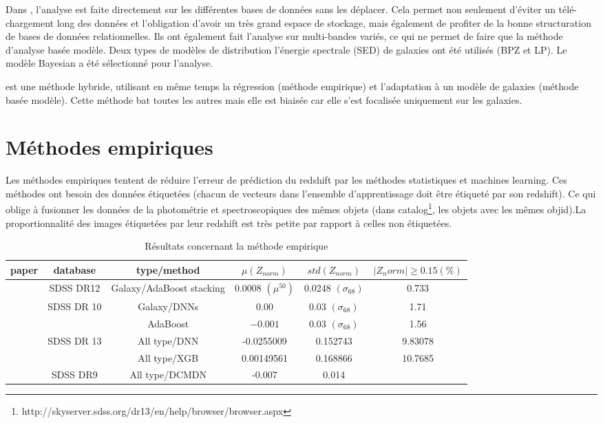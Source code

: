 Dans \cite{sql}, l'analyse est faite directement sur les différentes bases de données sans les déplacer. Cela permet non seulement d'éviter un télé-chargement long des données et l'obligation d'avoir un très grand espace de stockage, mais également de profiter de la bonne structuration de bases de données relationnelles. Ils ont également fait l'analyse sur multi-bandes variés, ce qui ne permet de faire que la méthode d'analyse basée modèle. Deux types de modèles de distribution l'énergie spectrale (SED) de galaxies ont été utilisés (BPZ et LP). Le modèle Bayesian a été sélectionné pour l'analyse. 

\cite{photoredSDSS} est une méthode hybride, utilisant en même temps la régression (méthode empirique) et l'adaptation à un modèle de galaxies (méthode basée modèle). Cette méthode bat toutes les autres mais elle est biaisée car elle s'est focalisée uniquement sur les galaxies.

\section{Méthodes empiriques}
Les méthodes empiriques tentent de réduire l'erreur de prédiction du redshift par les méthodes statistiques et machines learning. Ces méthodes ont besoin des données étiquetées (chacun de vecteurs dans l'ensemble d'apprentissage doit être étiqueté par son redshift). Ce qui oblige à fusionner les données de la photométrie et spectroscopiques des mêmes objets (dans catalog\footnote{http://skyserver.sdss.org/dr13/en/help/browser/browser.aspx}, les objets avec les mêmes objid).La proportionnalité des images étiquetées par leur redshift est très petite par rapport à celles non étiquetées.  

\begin{table}[!ht]
\centering    
\begin{tabular}{|c|c|c|c|c|c|}
    \hline paper & database & type/method & $\mu(Z_{norm})$ & $std(Z_{norm})$ & $|Z_norm|\ge0.15 (\%)$\\
    
    \hline 
    \cite{stack} & SDSS DR12 & Galaxy/AdaBoost stacking & 0.0008 $(\mu^{50})$ & 0.0248 $(\sigma_{68})$ & 0.733 \\
    \hline
    
    \multirow{2}{1cm}{\cite{ben}} & \multirow{2}{1cm}{SDSS DR 10} & Galaxy/DNNs & 0.00 & 0.03 $(\sigma_{68})$ & 1.71 \\
    \cline{3-6}
    & & AdaBoost & $-0.001$ & 0.03 $(\sigma_{68})$ & 1.56\\
    
    \hline
        \multirow{2}{1cm}{\cite{meuphirim}} & \multirow{2}{1cm}{SDSS DR 13}  & All type/DNN & -0.0255009 & 0.152743 & 9.83078\\
        \cline{3-6}
        & & All type/XGB & 0.00149561 & 0.168866 & 10.7685 \\
    \hline
        \cite{isanto} & SDSS DR9 & All type/DCMDN & -0.007 & 0.014 & \\
    \hline
    
\end{tabular}
    \caption{Résultats concernant la méthode empirique}
    \label{empirique}
\end{table}

